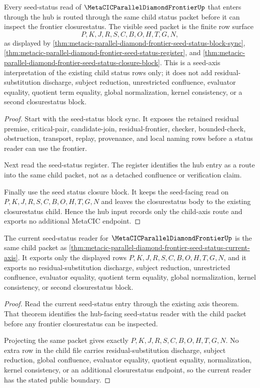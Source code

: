 \begin{theorem}
\label{thm:metacic-parallel-diamond-frontier-seed-status-current-axis}
Every seed-status read of $\MetaCICParallelDiamondFrontierUp$ that enters through the hub is routed through the same child status packet before it can inspect the frontier closurestatus. The visible seed packet is the finite row surface
$$
P,K,J,R,S,C,B,O,H,T,G,N ,
$$
as displayed by \autoref{thm:metacic-parallel-diamond-frontier-seed-status-block-sync}, \autoref{thm:metacic-parallel-diamond-frontier-seed-status-register}, and \autoref{thm:metacic-parallel-diamond-frontier-seed-status-closure-block}. This is a seed-axis interpretation of the existing child status rows only; it does not add residual-substitution discharge, subject reduction, unrestricted confluence, evaluator equality, quotient term equality, global normalization, kernel consistency, or a second closurestatus block.
\end{theorem}
\begin{proof}
Start with the seed-status block sync. It exposes the retained residual premise, critical-pair, candidate-join, residual-frontier, checker, bounded-check, obstruction, transport, replay, provenance, and local naming rows before a status reader can use the frontier.

Next read the seed-status register. The register identifies the hub entry as a route into the same child packet, not as a detached confluence or verification claim.

Finally use the seed status closure block. It keeps the seed-facing read on $P,K,J,R,S,C,B,O,H,T,G,N$ and leaves the closurestatus body to the existing closurestatus child. Hence the hub input records only the child-axis route and exports no additional MetaCIC endpoint.
\end{proof}

\begin{theorem}
\label{thm:metacic-parallel-diamond-frontier-seed-current-status}
The current seed-status reader for $\MetaCICParallelDiamondFrontierUp$ is the same child packet as \autoref{thm:metacic-parallel-diamond-frontier-seed-status-current-axis}. It exports only the displayed rows $P,K,J,R,S,C,B,O,H,T,G,N$, and it exports no residual-substitution discharge, subject reduction, unrestricted confluence, evaluator equality, quotient term equality, global normalization, kernel consistency, or second closurestatus block.
\end{theorem}
\begin{proof}
Read the current seed-status entry through the existing axis theorem. That theorem identifies the hub-facing seed-status reader with the child packet before any frontier closurestatus can be inspected.

Projecting the same packet gives exactly $P,K,J,R,S,C,B,O,H,T,G,N$. No extra row in the child file carries residual-substitution discharge, subject reduction, global confluence, evaluator equality, quotient equality, normalization, kernel consistency, or an additional closurestatus endpoint, so the current reader has the stated public boundary.
\end{proof}
